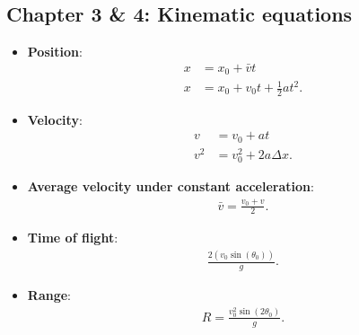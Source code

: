 \documentclass{report}
\begin{document}
    \subsection{Chapter 3 \& 4: Kinematic equations}
    \begin{itemize}
        \item \textbf{Position}:
            \begin{align*}
                x &= x_{0} + \bar{v}t \\
                x &= x_{0} + v_{0}t + \frac{1}{2}at^{2}
            .\end{align*}
        \item \textbf{Velocity}:
            \begin{align*}
                v &= v_{0} + at \\
                v^{2} &= v_{0}^{2} +2a\Delta x
            .\end{align*}
        \item \textbf{Average velocity under constant acceleration}:
            \begin{align*}
                \bar{v} = \frac{v_{0} + v}{2}
            .\end{align*}
        \item \textbf{Time of flight}:
            \begin{align*}
                \frac{2(v_{0}\sin{\left(\theta_{0}\right)})}{g}
            .\end{align*}
        \item \textbf{Range}:
            \begin{align*}
                R = \frac{v_{0}^{2}\sin{\left(2\theta_{0}\right)}}{g}
            .\end{align*}
    \end{itemize}

    \pagebreak 
\end{document}
